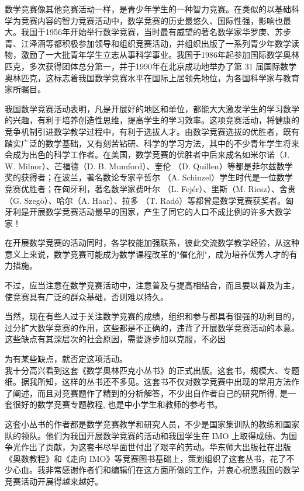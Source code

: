 \documentclass[10pt]{article}
\begin{document}
数学竞赛像其他竞赛活动一样，是青少年学生的一种智力竞赛。在类似的以基础科学为竞赛内容的智力竞赛活动中，数学竞赛的历史最悠久、国际性强，影响也最大。我国于1956年开始举行数学竞赛，当时最有威望的著名数学家华罗庚、苏步青、江泽涵等都积极参加领导和组织竞赛活动，并组织出版了一系列青少年数学读物，激励了一大批青年学生立志从事科学事业。我国于1986年起参加国际数学奥林匹克，多次获得团体总分第一，并于1990年在北京成功地举办了第 31 届国际数学奥林匹克，这标志着我国数学竞赛水平在国际上居领先地位，为各国科学家与教育家所瞩目。

我国数学竞赛活动表明，凡是开展好的地区和单位，都能大大激发学生的学习数学的兴趣，有利于培养创造性思维，提高学生的学习效率。这项竞赛活动，将健康的竞争机制引进数学教学过程中，有利于选拔人才。由数学竞赛选拔的优胜者，既有踏实广泛的数学基础，又有刻苦钻研、科学的学习方法，其中的不少青年学生将来会成为出色的科学工作者。在美国，数学竞赛的优胜者中后来成名如米尔诺（J. W. Milnor）、芒福德（D. B. Mumford）、奎伦 （D. Quillen）等都是菲尔兹数学奖的获得者；在波兰，著名数论专家辛哲尔 （A. Schinzel）学生时代是一位数学竞赛优胜者；在匈牙利，著名数学家费叶尔 （L. Fejér）、里斯（M. Riesz）、舍贵（G. Szegö）、哈尔（A. Haar）、拉多 （T. Radó）等都曾是数学竞赛获奖者。匈牙利是开展数学竞赛活动最早的国家，产生了同它的人口不成比例的许多大数学家！

在开展数学竞赛的活动同时，各学校能加强联系，彼此交流数学教学经验，从这种意义上来说，数学竞赛可能成为数学课程改革的"催化剂"，成为培养优秀人才的有力措施。

不过，应当注意在数学竞赛活动中，注意普及与提高相结合，而且要以普及为主，使竞赛具有广泛的群众基础，否则难以持久。

当然，现在有些人过于关注数学竞赛的成绩，组织和参与都具有很强的功利目的，过分扩大数学竞赛的作用，这些都是不正确的，违背了开展数学竞赛活动的本意。这些缺点有其深层次的社会原因，需要逐步加以克服，不必因

为有某些缺点，就否定这项活动。\\
我十分高兴看到这套《数学奥林匹克小丛书》的正式出版。这套书，规模大、专题细。据我所知，这样的丛书还不多见。这套书不仅对数学竞赛中出现的常用方法作了阐述，而且对竞赛题作了精到的分析解答，不少出自作者自己的研究所得, 是一套很好的数学竞赛专题教程, 也是中小学生和教师的参考书。

这套小丛书的作者都是数学竞赛教学和研究人员，不少是国家集训队的教练和国家队的领队。他们为我国开展数学竞赛的活动和我国学生在 IMO 上取得成绩、为国争光作出了贡献，为这套书尽早面世付出了艰辛的劳动。华东师大出版社在出版《奥数教程》和《走向 IMO》等竞赛图书基础上，策划组织了这套丛书，花了不少心血。我非常感谢作者们和编辑们在这方面所做的工作，并衷心祝愿我国的数学竞赛活动开展得越来越好。
\end{document}
